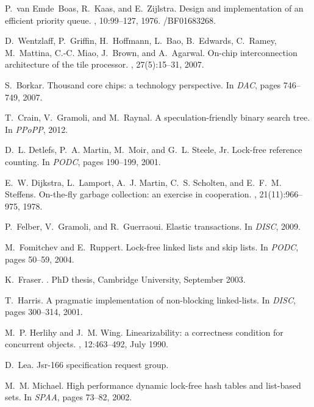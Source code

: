 \begin{thebibliography}{99}
{
P.~van Emde~Boas, R.~Kaas, and E.~Zijlstra.
\newblock Design and implementation of an efficient priority queue.
, 10:99--127, 1976.
/BF01683268.

D.~Wentzlaff, P.~Griffin, H.~Hoffmann, L.~Bao, B.~Edwards, C.~Ramey,
  M.~Mattina, C.-C. Miao, J.~Brown, and A.~Agarwal.
\newblock On-chip interconnection architecture of the tile processor.
, 27(5):15--31, 2007.







S.~Borkar.
\newblock Thousand core chips: a technology perspective.
\newblock In {\em DAC}, pages 746--749, 2007.

T.~Crain, V.~Gramoli, and M.~Raynal.
\newblock A speculation-friendly binary search tree.
\newblock In {\em PPoPP}, 2012.

D.~L. Detlefs, P.~A. Martin, M.~Moir, and G.~L. Steele, Jr.
\newblock Lock-free reference counting.
\newblock In {\em PODC}, pages 190--199, 2001.

E.~W. Dijkstra, L.~Lamport, A.~J. Martin, C.~S. Scholten, and E.~F.~M.
  Steffens.
\newblock On-the-fly garbage collection: an exercise in cooperation.
, 21(11):966--975, 1978.

P.~Felber, V.~Gramoli, and R.~Guerraoui.
\newblock Elastic transactions.
\newblock In {\em DISC}, 2009.

M.~Fomitchev and E.~Ruppert.
\newblock Lock-free linked lists and skip lists.
\newblock In {\em PODC}, pages 50--59, 2004.

K.~Fraser.
.
\newblock PhD thesis, Cambridge University, September 2003.

T.~Harris.
\newblock A pragmatic implementation of non-blocking linked-lists.
\newblock In {\em DISC}, pages 300--314, 2001.

M.~P. Herlihy and J.~M. Wing.
\newblock Linearizability: a correctness condition for concurrent objects.
, 12:463--492, July 1990.

D.~Lea.
\newblock Jsr-166 specification request group.

M.~M. Michael.
\newblock High performance dynamic lock-free hash tables and list-based sets.
\newblock In {\em SPAA}, pages 73--82, 2002.

}
\end{thebibliography}
